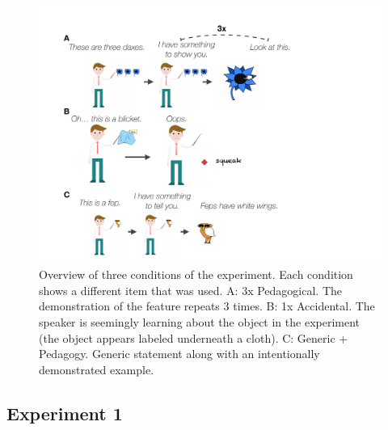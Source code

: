 \documentclass[10pt,letterpaper]{article}
\begin{document}
\begin{figure}[t]
\begin{center}
\includegraphics[width=\linewidth]{figs/expt-cartoon.pdf}
\end{center}
\caption{Overview of three conditions of the experiment. Each condition shows a different item that was used. A: 3x Pedagogical. The demonstration of the feature repeats 3 times. B: 1x Accidental. The speaker is seemingly learning about the object in the experiment (the object appears labeled underneath a cloth). C: Generic + Pedagogy. Generic statement along with an intentionally demonstrated example.}
\label{fig:expt}
\end{figure}


\subsection{Experiment 1}

\end{document}
